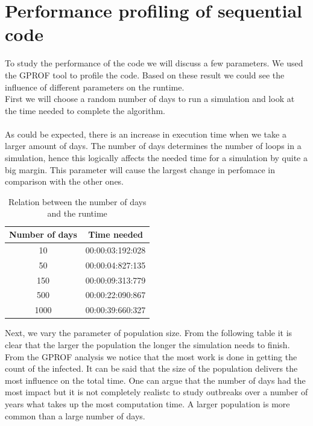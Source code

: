 \documentclass[runningheads]{llncs}
\begin{document}
\newpage
\section{Performance profiling of sequential code}
To study the performance of the code we will discuss a few parameters. We used the GPROF tool to profile the code. Based on these result we could see the influence of different parameters on the runtime.
\\
First we will choose a random number of days to run a simulation and look at the time needed to complete the algorithm. \\ 
\\
As could be expected, there is an increase in execution time when we take a larger amount of days. The number of days determines the number of loops in a simulation, hence this logically affects the needed time for a simulation by quite a big margin. This parameter will cause the largest change in perfomace in comparison with the other ones.

\begin{table}
\caption{Relation between the number of days and the runtime}
\begin{center}
	\begin{tabular}{ | c | c |}
	\hline
	Number of days & Time needed \\ \hline
	10 & 00:00:03:192:028 \\ \hline
	50 & 00:00:04:827:135 \\ \hline
	150 & 00:00:09:313:779 \\ \hline
	500 & 00:00:22:090:867 \\ \hline
	1000 & 00:00:39:660:327 \\
	\hline	
	\end{tabular}
\end{center}
\end{table}

\noindent
Next, we vary the parameter of population size. From the following table it is clear that the larger the population the longer the simulation needs to finish. From the GPROF analysis we notice that the most work is done in getting the count of the infected. It can be said that the size of the population delivers the most influence on the total time. One can argue that the number of days had the most impact but it is not completely realistc to study outbreaks over a number of years what takes up the most computation time. A larger population is more common than a large number of days.
\end{document}
